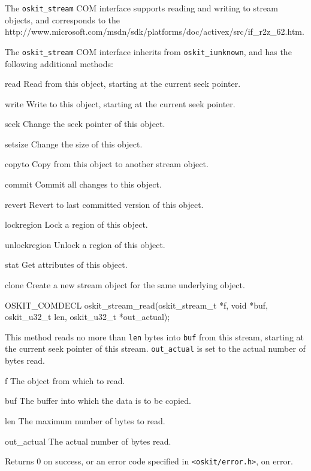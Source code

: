 
	The {\tt oskit_stream} COM interface supports reading and writing to
stream objects, and corresponds to the %
{http://www.microsoft.com/msdn/sdk/platforms/doc/activex/src/if_r2z_62.htm}.

	The {\tt oskit_stream} COM interface inherits from {\tt oskit_iunknown},
and has the following additional methods:	
\begin{csymlist}
\item[read]
	Read from this object, starting at the current seek pointer.
\item[write]
	Write to this object, starting at the current seek pointer.
\item[seek]
	Change the seek pointer of this object.
\item[setsize]
	Change the size of this object.
\item[copyto]
	Copy from this object to another stream object.
\item[commit]
	Commit all changes to this object.
\item[revert]
	Revert to last committed version of this object.
\item[lockregion]
	Lock a region of this object.
\item[unlockregion]
	Unlock a region of this object.
\item[stat]
	Get attributes of this object.
\item[clone]
	Create a new stream object for the same underlying object.
\end{csymlist}


\begin{apisyn}

	\funcproto OSKIT_COMDECL
	oskit_stream_read(oskit_stream_t *f, 
		         void *buf,
	                 oskit_u32_t len,
			 \outparam oskit_u32_t *out_actual);
\end{apisyn}
\begin{apidesc}
	This method reads no more than {\tt len} bytes into
	{\tt buf} from this stream, starting at the current
	seek pointer of this stream.  {\tt out_actual}
	is set to the actual number of bytes read.
\end{apidesc}
\begin{apiparm}
	\item[f]
		The object from which to read.
	\item[buf]
		The buffer into which the data is to be copied.
	\item[len]
		The maximum number of bytes to read.	
	\item[out_actual]
		The actual number of bytes read.
\end{apiparm}
\begin{apiret}
	Returns 0 on success, or an error code specified in
	{\tt <oskit/error.h>}, on error.
\end{apiret}


